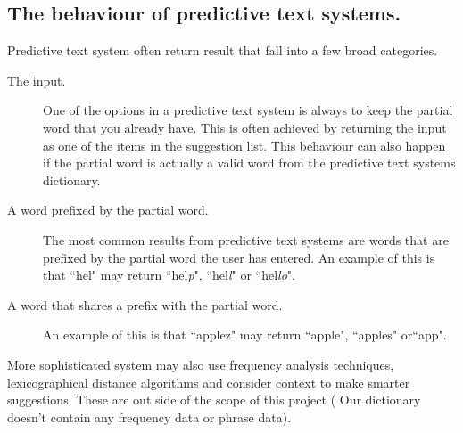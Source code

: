 \documentclass[10pt]{article} %
\begin{document}
		\subsection{The behaviour of predictive text systems.}
			Predictive text system often return result that fall into a few broad categories.
			\begin{description}
				\item [The input.] One of the options in a predictive text system is always to keep the partial word that you already have. This is often achieved by returning the input as one of the items in the suggestion list. This behaviour can also happen if the partial word is actually a valid word from the predictive text systems dictionary.
				\item [A word prefixed by the partial word.] The most common results from predictive text systems are words that are prefixed by the partial word the user has entered. An example of this is that ``hel" may return ``hel\textit{p}", ``hel\textit{l}" or ``hel\textit{lo}". 
				\item [A word that shares a prefix with the partial word.] An example of this is that ``applez" may return ``apple", ``apples" or``app". 
			\end{description}
			
			More sophisticated system may also use frequency analysis techniques, lexicographical distance algorithms and consider context to make smarter suggestions. These are out side of the scope of this project ( Our dictionary doesn't contain any frequency data or phrase data).
\end{document}
